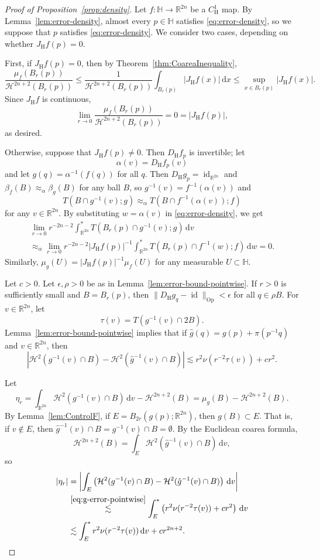 \documentclass[12pt,reqno]{amsart}
\newcommand{\cH}{\mathcal{H}}
\newcommand{\JfH}{J_\mathrm{H}f}
\newcommand{\HH}{\mathbb{H}}
\newcommand{\R}{\mathbb{R}}
\newcommand{\ud}[0]{\,\mathrm{d}}
\newcommand{\from}{\colon}
\theoremstyle{remark}
\newcommand{\0}{\mathbf{0}}
\renewcommand{\1}{\mathbf 1}
\DeclareMathOperator{\id}{id}
\begin{document}
\begin{proof}[Proof of Proposition~\ref{prop:density}]
  Let $f\from \HH\to \R^{2n}$ be a $C^1_{\mathrm{H}}$ map. By Lemma~\ref{lem:error-density}, almost every $p\in \HH$ satisfies \eqref{eq:error-density}, so we suppose that $p$ satisfies \eqref{eq:error-density}. We consider two cases, depending on whether $\JfH(p) = 0$.

  First, if $\JfH(p)=0$, then by Theorem~\ref{thm:CoareaInequality},
  $$\frac{\mu_f(B_r(p))}{\cH^{2n+2}(B_r(p))} \le \frac{1}{\cH^{2n+2}(B_r(p))} \int_{B_r(p)} |\JfH(x)| \ud x \le \sup_{x\in B_r(p)} |\JfH(x)|.$$
  Since $\JfH$ is continuous, 
  $$\lim_{r\to 0} \frac{\mu_f(B_r(p))}{\cH^{2n+2}(B_r(p))} = 0 = |\JfH(p)|,$$
  as desired.

  Otherwise, suppose that $\JfH(p) \ne 0$.  Then $D_{\mathrm H}f_p$ is invertible; let $$\alpha(v) = D_{\mathrm H}f_p(v)$$ and 
  let $g(q) = \alpha^{-1}(f(q))$ for all $q$. Then $D_{\mathrm H}g_{p} = \id_{\R^{2n}}$ and $\beta_f(B) \approx_{\alpha} \beta_g(B)$ for any ball $B$, so $g^{-1}(v)=f^{-1}(\alpha(v))$ and
  $$T(B \cap g^{-1}(v);g) \approx_\alpha T(B \cap f^{-1}(\alpha(v));f)$$
  for any $v\in \R^{2n}$. By substituting $w=\alpha(v)$ in  \eqref{eq:error-density}, we get
  \begin{multline}\label{eq:g-error-density}
    \lim_{r\to 0} r^{-2n-2}\int^*_{\R^{2n}} T(B_r(p) \cap g^{-1}(v);g) \ud v   \\ \approx_\alpha \lim_{r\to 0} r^{-2n-2} |\JfH(p)|^{-1} \int^*_{\R^{2n}} T(B_r(p) \cap f^{-1}(w);f) \ud w = 0.
  \end{multline}
  Similarly, $\mu_g(U) = |\JfH(p)|^{-1} \mu_f(U)$ for any measurable $U\subset \HH$.
  
  Let $c>0$. Let $\epsilon, \rho>0$ be as in Lemma~\ref{lem:error-bound-pointwise}. If $r > 0$ is sufficiently small and $B = B_r(p)$, then $\|D_{\mathrm H}g_q - \id\|_{\mathrm{Op}} < \epsilon$ for all $q\in \rho B$. For $v\in \R^{2n}$, let
  $$\tau(v) = T(g^{-1}(v)\cap 2B).$$
  Lemma~\ref{lem:error-bound-pointwise} implies that if $\hat{g}(q) = g(p) + \pi(p^{-1}q)$ and $v\in \R^{2n}$, then
  \begin{equation}\label{eq:g-error-pointwise}
    |\cH^2(g^{-1}(v)\cap B) - \cH^2(\hat{g}^{-1}(v)\cap B)| \lesssim r^2 \nu(r^{-2} \tau(v)) + c r^2.
  \end{equation} 

  Let
  $$\eta_r = \int_{\R^{2n}} \cH^2(g^{-1}(v)\cap B) \ud v - \cH^{2n+2}(B) = \mu_g(B) - \cH^{2n+2}(B).$$
  By Lemma~\ref{lem:ControlF}, if $E = B_{2r}(g(p);\R^{2n})$, then $g(B)\subset E$. That is, if $v\not \in E$, then $\hat{g}^{-1}(v)\cap B = g^{-1}(v)\cap B = \emptyset$. By the Euclidean coarea formula,
  $$\cH^{2n+2}(B) = \int_{E} \cH^2(\hat{g}^{-1}(v)\cap B) \ud v,$$
  so 
  \begin{align*}
    |\eta_r|
    &=\left|  \int_{E} \left(\cH^2(g^{-1}(v)\cap B) - \cH^2(\hat{g}^{-1}(v)\cap B) \right)\ud v \right| \\ 
    &\stackrel{\eqref{eq:g-error-pointwise}}{\lesssim} \int^*_E \left(r^2 \nu(r^{-2} \tau(v)) + c r^2\right) \ud v \\ 
    &\lesssim \int^*_E r^2 \nu(r^{-2} \tau(v)) \ud v + c r^{2n+2}.
  \end{align*}


\end{proof}
\end{document}
